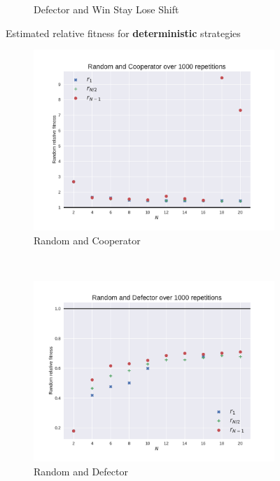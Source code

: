 \documentclass{article}
\begin{document}
\begin{figure}[!hbtp]
\begin{subfigure}[t]{.3\textwidth}
        \caption{Defector and Win Stay Lose Shift}
    \end{subfigure}%
    \caption{Estimated relative fitness
             for \textbf{deterministic} strategies}
    \label{fig:comparison_deterministic}
\end{figure}

\begin{figure}[!hbtp]
    \centering
    \begin{subfigure}[t]{.3\textwidth}
        \centering
        \includegraphics[width=.8\textwidth]{./img/Random_v_Cooperator_fitness.pdf}
        \caption{Random and Cooperator}
    \end{subfigure}%
    ~
    \begin{subfigure}[t]{.3\textwidth}
        \centering
        \includegraphics[width=.8\textwidth]{./img/Random_v_Defector_fitness.pdf}
        \caption{Random and Defector}
    \end{subfigure}%
    ~
    \begin{subfigure}[t]{.3\textwidth}
        \centering

\end{subfigure}
\end{figure}
\end{document}
